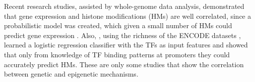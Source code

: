 Recent research studies, assisted by whole-genome data analysis, demonstrated that gene expression and histone modifications (HMs) are well correlated, since a probabilistic model was created, which given a small number of HMs could predict gene expression \citep{Karlic2010}. Also, \citet{Benveniste2014}, using the richness of the ENCODE datasets \citep{Dunham2012}, learned a logistic regression classifier with the TFs as input features and showed that only from knowledge of TF binding patterns at promoters they could accurately predict HMs. These are only some studies that show the correlation between genetic and epigenetic mechanisms. 
